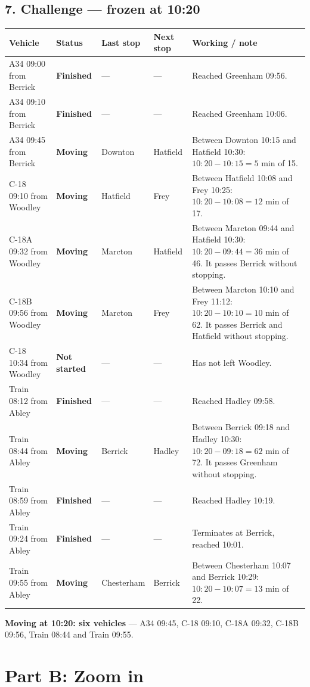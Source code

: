 \documentclass[11pt,a4paper]{article}
\newcommand{\ans}[1]{\textcolor{red!75!black}{\textbf{#1}}}
\begin{document}
\subsection*{7. Challenge --- frozen at 10:20}
\begin{tabularx}{\linewidth}{@{}l l l l X@{}}
\toprule
Vehicle & Status & Last stop & Next stop & Working / note\\
\midrule
A34 09:00 from Berrick & \ans{Finished} & --- & --- & Reached Greenham 09:56.\\
A34 09:10 from Berrick & \ans{Finished} & --- & --- & Reached Greenham 10:06.\\
A34 09:45 from Berrick & \ans{Moving} & Downton & Hatfield & Between Downton 10:15 and Hatfield 10:30: \(10{:}20-10{:}15=5\) min of 15.\\
C-18 09:10 from Woodley & \ans{Moving} & Hatfield & Frey & Between Hatfield 10:08 and Frey 10:25: \(10{:}20-10{:}08=12\) min of 17.\\
C-18A 09:32 from Woodley & \ans{Moving} & Marcton & Hatfield & Between Marcton 09:44 and Hatfield 10:30: \(10{:}20-09{:}44=36\) min of 46. It passes Berrick without stopping.\\
C-18B 09:56 from Woodley & \ans{Moving} & Marcton & Frey & Between Marcton 10:10 and Frey 11:12: \(10{:}20-10{:}10=10\) min of 62. It passes Berrick and Hatfield without stopping.\\
C-18 10:34 from Woodley & \ans{Not started} & --- & --- & Has not left Woodley.\\
Train 08:12 from Abley & \ans{Finished} & --- & --- & Reached Hadley 09:58.\\
Train 08:44 from Abley & \ans{Moving} & Berrick & Hadley & Between Berrick 09:18 and Hadley 10:30: \(10{:}20-09{:}18=62\) min of 72. It passes Greenham without stopping.\\
Train 08:59 from Abley & \ans{Finished} & --- & --- & Reached Hadley 10:19.\\
Train 09:24 from Abley & \ans{Finished} & --- & --- & Terminates at Berrick, reached 10:01.\\
Train 09:55 from Abley & \ans{Moving} & Chesterham & Berrick & Between Chesterham 10:07 and Berrick 10:29: \(10{:}20-10{:}07=13\) min of 22.\\
\bottomrule
\end{tabularx}

\ans{Moving at 10:20: six vehicles} --- A34 09:45, C-18 09:10, C-18A 09:32, C-18B 09:56, Train 08:44 and Train 09:55.

\section*{Part B: Zoom in}
\end{document}
